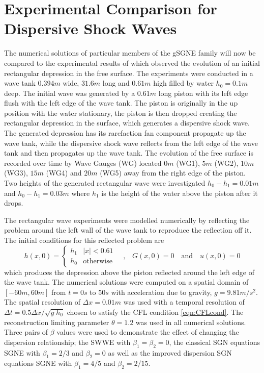\documentclass[10pt]{elsarticle}
\providecommand{\DIFaddtex}[1]{{\protect\color{blue} \sf #1}} %
\providecommand{\DIFdeltex}[1]{{\protect\color{red} \scriptsize #1}} %
\providecommand{\DIFaddbegin}{} %
\providecommand{\DIFaddend}{} %
\providecommand{\DIFdelbegin}{} %
\providecommand{\DIFdelend}{} %
\providecommand{\DIFadd}[1]{\texorpdfstring{\DIFaddtex{#1}}{#1}} %
\providecommand{\DIFdel}[1]{\texorpdfstring{\DIFdeltex{#1}}{}} %
\newcommand{\DIFscaledelfig}{0.5}
\newlength{\DIFdelgraphicswidth} %
\newlength{\DIFdelgraphicsheight} %
\newcommand{\DIFaddincludegraphics}[2][]{{\color{blue}\fbox{\DIFOincludegraphics[#1]{#2}}}} %
\newcommand{\DIFdelincludegraphics}[2][]{%
\sbox{\DIFdelgraphicsbox}{\DIFOincludegraphics[#1]{#2}}%
\settoboxwidth{\DIFdelgraphicswidth}{\DIFdelgraphicsbox} %
\settoboxtotalheight{\DIFdelgraphicsheight}{\DIFdelgraphicsbox} %
\scalebox{\DIFscaledelfig}{%
\parbox[b]{\DIFdelgraphicswidth}{\usebox{\DIFdelgraphicsbox}\\[-\baselineskip] \rule{\DIFdelgraphicswidth}{0em}}\llap{\resizebox{\DIFdelgraphicswidth}{\DIFdelgraphicsheight}{%
\setlength{\unitlength}{\DIFdelgraphicswidth}%
\begin{picture}(1,1)%
\thicklines\linethickness{2pt} %
{\color[rgb]{1,0,0}\put(0,0){\framebox(1,1){}}}%
{\color[rgb]{1,0,0}\put(0,0){\line( 1,1){1}}}%
{\color[rgb]{1,0,0}\put(0,1){\line(1,-1){1}}}%
\end{picture}%
}\hspace*{3pt}}} %
} %
\DeclareRobustCommand{\DIFaddbegin}{\DIFOaddbegin \let\includegraphics\DIFaddincludegraphics} %
\DeclareRobustCommand{\DIFaddend}{\DIFOaddend \let\includegraphics\DIFOincludegraphics} %
\DeclareRobustCommand{\DIFdelbegin}{\DIFOdelbegin \let\includegraphics\DIFdelincludegraphics} %
\DeclareRobustCommand{\DIFdelend}{\DIFOaddend \let\includegraphics\DIFOincludegraphics} %
\begin{document}
\section{Experimental Comparison for Dispersive Shock Waves}

The numerical solutions of particular members of the gSGNE family will now be compared to the experimental results of \citet{Hammack-Segur-1978-337} which observed the evolution of an initial rectangular depression in the free surface. The experiments were conducted in a wave tank $0.394m$ wide, $31.6m$ long and $0.61m$ high filled by water $h_0 = 0.1m$ deep. The initial wave was generated by a $0.61m$ long piston with its left edge flush with the left edge of the wave tank. The piston is originally in the up position with the water stationary, the piston is then dropped creating the rectangular depression in the surface, which generates a dispersive shock wave. The generated depression has its rarefaction fan component propagate up the wave tank, while the dispersive shock wave reflects from the left edge of the wave tank and then propagates up the wave tank. The evolution of the free surface is recorded over time by Wave Gauges (WG) located $0m$ (WG1), $5m$ (WG2), $10m$ (WG3), $15m$ (WG4) and $20m$ (WG5) away from the right edge of the piston. Two heights of the \DIFaddbegin \DIFadd{generated }\DIFaddend rectangular wave were investigated $h_0 - h_1 = 0.01m$ and $h_0 - h_1 = 0.03m$ where $h_1$ is the height of the water above the piston after it drops.

The rectangular wave experiments were modelled numerically by reflecting the problem around the left wall of the wave tank to reproduce the reflection off it. The initial conditions for this reflected problem are
\begin{equation*}
h(x,0) = \begin{cases}
	h_1 &  |x| < 0.61 \\
	h_0 & \text{otherwise}
\end{cases}
\quad
\text{,}
\quad
G(x,0) = 0
\quad
\text{and}
\quad
u(x,0) = 0
\end{equation*}
which produces the depression above the piston reflected around the left edge of the wave tank. The numerical solutions were computed on a spatial domain of $[-60m,60m]$ from $t = 0 s$ to $50s$ with acceleration due to gravity, $g = 9.81m/s^2$. The spatial resolution of $\Delta x = 0.01m$ was used with a temporal resolution of $\Delta t = 0.5 \Delta x / \sqrt{g \; h_0}$ chosen to satisfy the CFL condition \eqref{eqn:CFLcond}. The reconstruction limiting parameter $\theta = 1.2$ was used in all numerical solutions. Three pairs of $\beta$ values were used to demonstrate the effect of changing the dispersion relationship; the SWWE with $\beta_1=\beta_2=0$, the classical \DIFdelbegin \DIFdel{SGN equations }\DIFdelend \DIFaddbegin \DIFadd{SGNE }\DIFaddend with $\beta_1=2/3$ and $\beta_2=0$ as well as the improved dispersion \DIFdelbegin \DIFdel{SGN equations }\DIFdelend \DIFaddbegin \DIFadd{SGNE }\DIFaddend with  $\beta_1=4/5$ and $\beta_2=2/15$.
\end{document}
